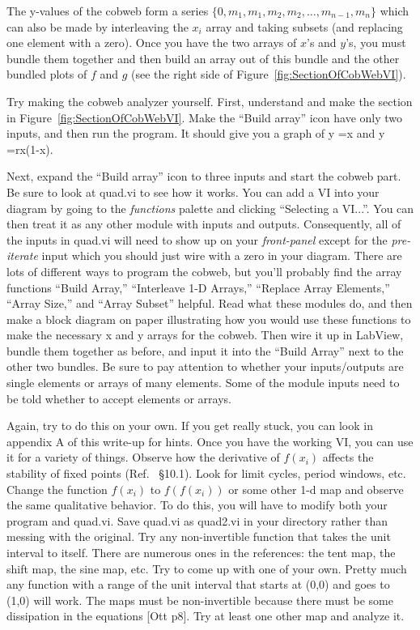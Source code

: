 \documentclass{../lab}
\begin{document}
The y-values of the cobweb form a series $\{0,m_1,m_1,m_2,m_2,\ldots ,m_{n-1},m_n\}$ which can also be made by interleaving the $x_i$ array and taking subsets (and replacing one element with a zero). Once you have the two arrays of $x$'s and $y$'s, you must bundle them together and then build an array out of this bundle and the other bundled plots of $f$ and $g$ (see the right side of Figure~\ref{fig:SectionOfCobWebVI}).

Try making the cobweb analyzer yourself. First, understand and make the section in Figure~\ref{fig:SectionOfCobWebVI}. Make the ``Build array'' icon have only two inputs, and then run the program. It should give you a graph of y =x and y =rx(1-x).

Next, expand the ``Build array'' icon to three inputs and start the cobweb part. Be sure to look at quad.vi to see how it works. You can add a VI into your diagram by going to the \emph{functions} palette and clicking ``Selecting a VI...''. You can then treat it as any other module with inputs and outputs. Consequently, all of the inputs in quad.vi will need to show up on your \emph{front-panel} except for the \emph{pre-iterate} input which you should just wire with a zero in your diagram. There are lots of different ways to program the cobweb, but you'll probably find the array functions ``Build Array,'' ``Interleave 1-D Arrays,'' ``Replace Array Elements,'' ``Array Size,'' and ``Array Subset'' helpful. Read what these modules do, and then make a block diagram on paper illustrating how you would use these functions to make the necessary x and y arrays for the cobweb. Then wire it up in LabView, bundle them together as before, and input it into the ``Build Array'' next to the other two bundles. Be sure to pay attention to whether your inputs/outputs are single elements or arrays of many elements. Some of the module inputs need to be told whether to accept elements or arrays.

Again, try to do this on your own. If you get really stuck, you can look in appendix A of this write-up for hints. Once you have the working VI, you can use it for a variety of things. Observe how the derivative of $f(x_i)$ affects the stability of fixed points (Ref.~\cite{Strogatz} \S10.1). Look for limit cycles, period windows, etc. Change the function $f(x_i)$ to $f(f(x_i))$ or some other 1-d map and observe the same qualitative behavior. To do this, you will have to modify both your program and quad.vi. Save quad.vi as quad2.vi in your directory rather than messing with the original. Try any non-invertible function that takes the unit interval to itself. There are numerous ones in the references: the tent map, the shift map, the sine map, etc. Try to come up with one of your own. Pretty much any function with a range of the unit interval that starts at (0,0) and goes to (1,0) will work. The maps must be non-invertible because there must be some dissipation in the equations [Ott \cite{Ott} p8]. Try at least one other map and analyze it.
\end{document}
